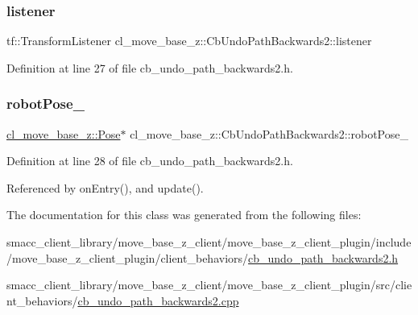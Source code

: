 \mbox{\label{classcl__move__base__z_1_1CbUndoPathBackwards2_a4531d3f52b12a4cce20ac1545ca2cb61}} 
\subsubsection{\texorpdfstring{listener}{listener}}
{\footnotesize\ttfamily tf\+::\+Transform\+Listener cl\+\_\+move\+\_\+base\+\_\+z\+::\+Cb\+Undo\+Path\+Backwards2\+::listener\hspace{0.3cm}{\ttfamily [private]}}



Definition at line 27 of file cb\+\_\+undo\+\_\+path\+\_\+backwards2.\+h.

\mbox{\label{classcl__move__base__z_1_1CbUndoPathBackwards2_a2d398dac07efaca840fbcea31957cf7a}} 
\subsubsection{\texorpdfstring{robot\+Pose\+\_\+}{robotPose\_}}
{\footnotesize\ttfamily \hyperlink{classcl__move__base__z_1_1Pose}{cl\+\_\+move\+\_\+base\+\_\+z\+::\+Pose}$\ast$ cl\+\_\+move\+\_\+base\+\_\+z\+::\+Cb\+Undo\+Path\+Backwards2\+::robot\+Pose\+\_\+\hspace{0.3cm}{\ttfamily [private]}}



Definition at line 28 of file cb\+\_\+undo\+\_\+path\+\_\+backwards2.\+h.



Referenced by on\+Entry(), and update().



The documentation for this class was generated from the following files\+:\begin{DoxyCompactItemize}
\item 
smacc\+\_\+client\+\_\+library/move\+\_\+base\+\_\+z\+\_\+client/move\+\_\+base\+\_\+z\+\_\+client\+\_\+plugin/include/move\+\_\+base\+\_\+z\+\_\+client\+\_\+plugin/client\+\_\+behaviors/\hyperlink{cb__undo__path__backwards2_8h}{cb\+\_\+undo\+\_\+path\+\_\+backwards2.\+h}\item 
smacc\+\_\+client\+\_\+library/move\+\_\+base\+\_\+z\+\_\+client/move\+\_\+base\+\_\+z\+\_\+client\+\_\+plugin/src/client\+\_\+behaviors/\hyperlink{cb__undo__path__backwards2_8cpp}{cb\+\_\+undo\+\_\+path\+\_\+backwards2.\+cpp}\end{DoxyCompactItemize}
